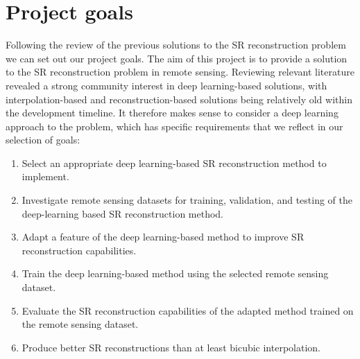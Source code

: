 \section{Project goals}
Following the review of the previous solutions to the SR reconstruction problem we can set out our project goals. The aim of this project is to provide a solution to the SR reconstruction problem in remote sensing. Reviewing relevant literature revealed a strong community interest in deep learning-based solutions, with interpolation-based and reconstruction-based solutions being relatively old within the development timeline. It therefore makes sense to consider a deep learning approach to the problem, which has specific requirements that we reflect in our selection of goals:
\begin{enumerate}
    \item Select an appropriate deep learning-based SR reconstruction method to implement.
    \item Investigate remote sensing datasets for training, validation, and testing of the deep-learning based SR reconstruction method.
    \item Adapt a feature of the deep learning-based method to improve SR reconstruction capabilities.
    \item Train the deep learning-based method using the selected remote sensing dataset.
    \item Evaluate the SR reconstruction capabilities of the adapted method trained on the remote sensing dataset.
    \item Produce better SR reconstructions than at least bicubic interpolation.
\end{enumerate}